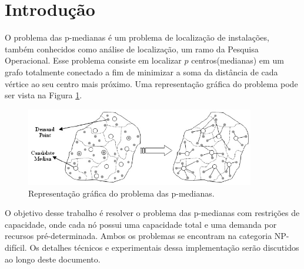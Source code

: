 \section{Introdução}

O problema das p-medianas é um problema de localização de instalações, também conhecidos como análise de localização, um ramo da Pesquisa Operacional. Esse problema consiste em localizar $p$ centros(medianas) em um grafo totalmente conectado a fim de minimizar a soma da distância de cada vértice ao seu centro mais próximo. Uma representação gráfica do problema pode ser vista na Figura \ref{fig:p-medians}.

\begin{figure}[h]	
  \centering
  \includegraphics[width=10cm,keepaspectratio]{images/p-medians.png}
  \caption{Representação gráfica do problema das p-medianas.}
  \label{fig:p-medians}
\end{figure}

O objetivo desse trabalho é resolver o problema das p-medianas com restrições de capacidade, onde cada nó possui uma capacidade total e uma demanda por recursos pré-determinada. Ambos os problemas se encontram na categoria NP-difícil. Os detalhes técnicos e experimentais dessa implementação serão discutidos ao longo deste documento.

